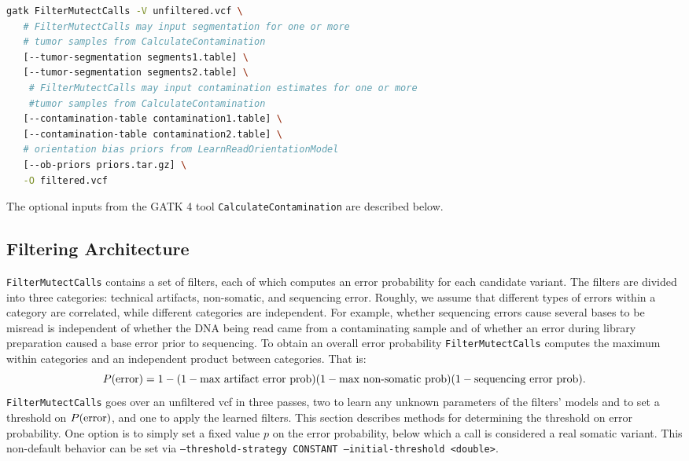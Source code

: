 \documentclass[nofootinbib,amssymb,amsmath]{revtex4}
\newcommand{\code}[1]{\texttt{#1}}
\begin{document}
\begin{lstlisting}[language=bash,caption={FilterMutectCalls command}, label={cmd-mutect2}]
gatk FilterMutectCalls -V unfiltered.vcf \
   # FilterMutectCalls may input segmentation for one or more 
   # tumor samples from CalculateContamination
   [--tumor-segmentation segments1.table] \
   [--tumor-segmentation segments2.table] \
    # FilterMutectCalls may input contamination estimates for one or more 
    #tumor samples from CalculateContamination
   [--contamination-table contamination1.table] \
   [--contamination-table contamination2.table] \
   # orientation bias priors from LearnReadOrientationModel
   [--ob-priors priors.tar.gz] \
   -O filtered.vcf
\end{lstlisting}

The optional inputs from the GATK 4 tool \code{CalculateContamination} are described below.

\subsection{Filtering Architecture}
\code{FilterMutectCalls} contains a set of filters, each of which computes an error probability for each candidate variant.  The filters are divided into three categories: technical artifacts, non-somatic, and sequencing error.  Roughly, we assume that different types of errors within a category are correlated, while different categories are independent.  For example, whether sequencing errors cause several bases to be misread is independent of whether the DNA being read came from a contaminating sample and of whether an error during library preparation caused a base error prior to sequencing.  To obtain an overall error probability \code{FilterMutectCalls} computes the maximum within categories and an independent product between categories.  That is:
\begin{equation}
P({\rm error}) = 1 - (1 - \textrm{max artifact error prob})(1 - \textrm{max non-somatic prob})(1 - \textrm{sequencing error prob}).
\end{equation}
\code{FilterMutectCalls} goes over an unfiltered vcf in three passes, two to learn any unknown parameters of the filters' models and to set a threshold on $P({\rm error})$, and one to apply the learned filters.  This section describes methods for determining the threshold on error probability.  One option is to simply set a fixed value $p$ on the error probability, below which a call is considered a real somatic variant.  This non-default behavior can be set via \code{--threshold-strategy CONSTANT --initial-threshold <double>}.
\end{document}
